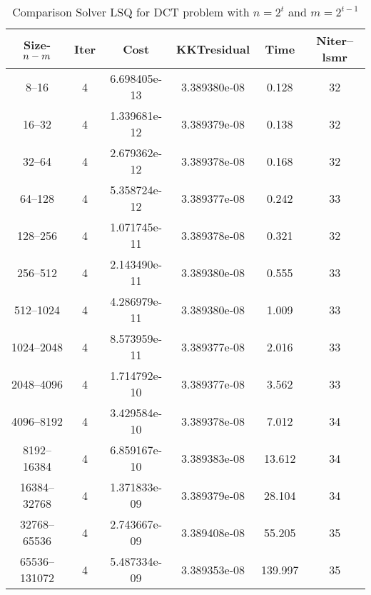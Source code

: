 \documentclass[letterpaper,12pt,oneside,final]{book}
\begin{document}
\begin{table}
\caption{Comparison Solver LSQ  for  DCT problem with $n=2^{t}$ and $m=2^{t-1}$} 
\begin{center}
\begin{tabular}{|*{6}{c}|} \hline
Size-$n\--m$ & \multicolumn{1}{c}{Iter} & \multicolumn{1}{c}{Cost}& \multicolumn{1}{c}{KKTresidual} & \multicolumn{1}{c}{Time} & \multicolumn{1}{c|}{Niter--lsmr} \\ 
\hline


8--16&      4    &       6.698405e-13&   3.389380e-08&   0.128&   32   \\       
16--32&      4    &       1.339681e-12&   3.389379e-08&   0.138&   32   \\       
32--64&      4    &       2.679362e-12&   3.389378e-08&   0.168&   32   \\       
64--128&      4    &       5.358724e-12&   3.389377e-08&   0.242&   33   \\       
128--256&      4    &       1.071745e-11&   3.389378e-08&   0.321&   32   \\       
256--512&      4    &       2.143490e-11&   3.389380e-08&   0.555&   33   \\       
512--1024&      4    &       4.286979e-11&   3.389380e-08&   1.009&   33   \\       
1024--2048&      4    &       8.573959e-11&   3.389377e-08&   2.016&   33   \\       
2048--4096&      4    &       1.714792e-10&   3.389377e-08&   3.562&   33   \\       
4096--8192&      4    &       3.429584e-10&   3.389378e-08&   7.012&   34   \\       
8192--16384&      4    &       6.859167e-10&   3.389383e-08&   13.612&   34   \\       
16384--32768&      4    &       1.371833e-09&   3.389379e-08&   28.104&   34   \\       
32768--65536&      4    &       2.743667e-09&   3.389408e-08&   55.205&   35   \\       
65536--131072&      4    &       5.487334e-09&   3.389353e-08&   139.997&   35   \\

\hline
\end{tabular}
\end{center}
\end{table}
\end{document}
